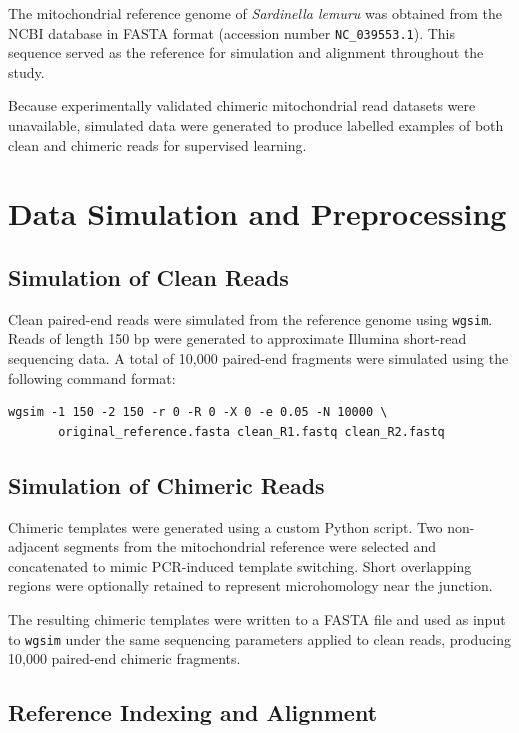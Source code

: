 The mitochondrial reference genome of \textit{Sardinella lemuru} was obtained from the NCBI database in FASTA format (accession number \texttt{NC\_039553.1}). This sequence served as the reference for simulation and alignment throughout the study.

Because experimentally validated chimeric mitochondrial read datasets were unavailable, simulated data were generated to produce labelled examples of both clean and chimeric reads for supervised learning.

\section{Data Simulation and Preprocessing}

\subsection{Simulation of Clean Reads}

Clean paired-end reads were simulated from the reference genome using \texttt{wgsim}. Reads of length 150 bp were generated to approximate Illumina short-read sequencing data. A total of 10{,}000 paired-end fragments were simulated using the following command format:

\begin{verbatim}
wgsim -1 150 -2 150 -r 0 -R 0 -X 0 -e 0.05 -N 10000 \
       original_reference.fasta clean_R1.fastq clean_R2.fastq
\end{verbatim}

\subsection{Simulation of Chimeric Reads}

Chimeric templates were generated using a custom Python script. Two non-adjacent segments from the mitochondrial reference were selected and concatenated to mimic PCR-induced template switching. Short overlapping regions were optionally retained to represent microhomology near the junction.

The resulting chimeric templates were written to a FASTA file and used as input to \texttt{wgsim} under the same sequencing parameters applied to clean reads, producing 10{,}000 paired-end chimeric fragments.

\subsection{Reference Indexing and Alignment}

